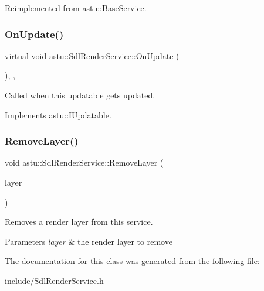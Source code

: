 Reimplemented from \hyperlink{classastu_1_1BaseService_ac8710cd2d6dcc990db65e7c8ccfbc5ff}{astu\+::\+Base\+Service}.

\mbox{\label{classastu_1_1SdlRenderService_af109517e98ab8bce1e625122a441fb75}} 
\subsubsection{\texorpdfstring{On\+Update()}{OnUpdate()}}
{\footnotesize\ttfamily virtual void astu\+::\+Sdl\+Render\+Service\+::\+On\+Update (\begin{DoxyParamCaption}{ }\end{DoxyParamCaption})\hspace{0.3cm}{\ttfamily [override]}, {\ttfamily [protected]}, {\ttfamily [virtual]}}

Called when this updatable gets updated. 

Implements \hyperlink{classastu_1_1IUpdatable_a76c7c6e2a71b725bbdbdf6808ef4743f}{astu\+::\+I\+Updatable}.

\mbox{\label{classastu_1_1SdlRenderService_a88ffe81ca6348b12b0185310932bd4ee}} 
\subsubsection{\texorpdfstring{Remove\+Layer()}{RemoveLayer()}}
{\footnotesize\ttfamily void astu\+::\+Sdl\+Render\+Service\+::\+Remove\+Layer (\begin{DoxyParamCaption}\item[{std\+::shared\+\_\+ptr$<$ \hyperlink{classastu_1_1ISdlRenderLayer}{I\+Sdl\+Render\+Layer} $>$}]{layer }\end{DoxyParamCaption})}

Removes a render layer from this service.


\begin{DoxyParams}{Parameters}
{\em layer} & the render layer to remove \\
\hline
\end{DoxyParams}


The documentation for this class was generated from the following file\+:\begin{DoxyCompactItemize}
\item 
include/Sdl\+Render\+Service.\+h\end{DoxyCompactItemize}
